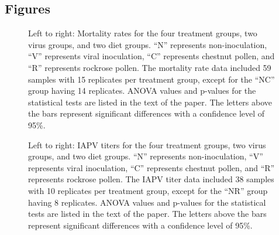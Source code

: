 \documentclass{bmcart}
\begin{document}
\begin{linenumbers}
\begin{backmatter}


\newpage
\section*{Figures}

\begin{figure}[h!]
\caption{
Left to right: Mortality rates for the four treatment groups, two virus groups, and two diet groups. ``N'' represents non-inoculation, ``V'' represents viral inoculation, ``C'' represents chestnut pollen, and ``R'' represents rockrose pollen. The mortality rate data included 59 samples with 15 replicates per treatment group, except for the ``NC'' group having 14 replicates. ANOVA values and p-values for the statistical tests are listed in the text of the paper. The letters above the bars represent significant differences with a confidence level of 95\%.}
\end{figure}

\begin{figure}[h!]
\caption{
Left to right: IAPV titers for the four treatment groups, two virus groups, and two diet groups. ``N'' represents non-inoculation, ``V'' represents viral inoculation, ``C'' represents chestnut pollen, and ``R'' represents rockrose pollen. The IAPV titer data included 38 samples with 10 replicates per treatment group, except for the ``NR'' group having 8 replicates. ANOVA values and p-values for the statistical tests are listed in the text of the paper. The letters above the bars represent significant differences with a confidence level of 95\%.}
\end{figure}


\end{backmatter}
\end{linenumbers}
\end{document}
